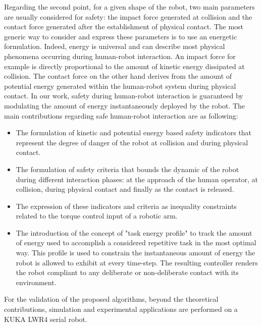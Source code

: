 Regarding the second point, for a given shape of the robot, two main parameters are usually considered for safety: the impact force generated at collision and the contact force generated after the establishment of physical contact. The most generic way to consider and express these parameters is to use an energetic formulation. Indeed, energy is universal  and can describe most physical phenomena occurring during human-robot interaction. An impact force for example is directly proportional to the amount of kinetic energy dissipated at collision. The contact force on the other hand derives from the amount of potential energy generated within the human-robot system during physical contact. In our work, safety during human-robot interaction is guaranteed by modulating the amount of energy instantaneously deployed by the robot. The main contributions regarding safe human-robot interaction are as following:
\begin{itemize}
\item The formulation of kinetic and potential energy based safety indicators that represent the degree of danger of the robot at collision and during physical contact.
\item The formulation of safety criteria that bounds the dynamic of the robot during different interaction phases: at the approach of the human operator, at collision, during physical contact and finally as the contact is released.
\item The expression of these indicators and criteria as inequality constraints related to the torque control input of a robotic arm.
\item The introduction of the concept of "task energy profile" to track the amount of energy used to accomplish a considered repetitive task in the most optimal way. This profile is used to constrain the instantaneous amount of energy the robot is allowed to exhibit at every time-step.
The resulting controller renders the robot compliant to any deliberate or non-deliberate contact with its environment.
\end{itemize}
For the validation of the proposed algorithms, beyond the theoretical contributions, simulation and experimental applications are performed on a KUKA LWR4 serial robot. 
